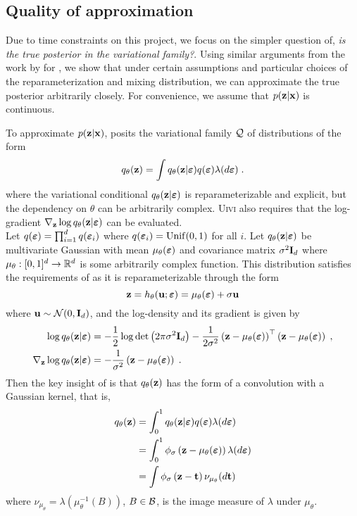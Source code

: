 \documentclass[10pt]{article}
\begin{document}
\subsection{Quality of approximation}

\todo Due to time constraints on this project, we focus on the simpler question of, \textit{is the true posterior in the \uivi variational family?}. Using similar arguments from the work by \citet{Plummer:2021} for \nllvm, we show that under certain assumptions and particular choices of the reparameterization and mixing distribution, we can approximate the true posterior arbitrarily closely. For convenience, we assume that $p(\mathbf{z}|\mathbf{x})$ is continuous.

\todo

To approximate $p(\mathbf{z}|\mathbf{x})$, \uivi posits the variational family $\mathcal{Q}$ of distributions of the form
\[
q_\theta(\mathbf{z}) = \int q_\theta(\mathbf{z}|\bm{\varepsilon})q(\bm{\varepsilon})\lambda(d\bm{\varepsilon}) \;.
\]
where the variational conditional $q_\theta(\mathbf{z}|\bm{\varepsilon})$ is reparameterizable and explicit, but the dependency on $\theta$ can be arbitrarily complex. \textsc{Uivi} also requires that the log-gradient $\nabla_{\mathbf{z}}\log q_\theta(\mathbf{z}|\bm{\varepsilon})$ can be evaluated.
\\

Let $q(\bm{\varepsilon})=\prod_{i=1}^dq(\bm{\varepsilon}_i)$ where $q(\bm{\varepsilon}_i)=\mathrm{Unif}(0,1)$ for all $i$. Let $q_\theta(\mathbf{z}|\bm{\varepsilon})$ be multivariate Gaussian with mean $\mu_\theta(\bm{\varepsilon})$ and covariance matrix $\sigma^2\mathbf{I}_d$ where $\mu_\theta:[0,1]^d\rightarrow\mathbb{R}^d$ is some arbitrarily complex function. This distribution satisfies the requirements of \uivi as it is reparameterizable through the form
\[
\mathbf{z} = h_\theta(\mathbf{u};\bm{\varepsilon}) = \mu_\theta(\bm{\varepsilon}) + \sigma\mathbf{u}
\]
where $\mathbf{u}\sim \mathcal{N}(0,\mathbf{I}_d)$, and the log-density and its gradient is given by
\begin{align*}
\log q_\theta(\mathbf{z}|\bm{\varepsilon}) &= -\frac{1}{2}\log\det\left(2\pi\sigma^2\mathbf{I}_d\right)-\frac{1}{2\sigma^2}\left(\mathbf{z}-\mu_\theta(\bm{\varepsilon})\right)^\top\left(\mathbf{z}-\mu_\theta(\bm{\varepsilon})\right) \;, \\
\nabla_{\mathbf{z}} \log q_\theta(\mathbf{z}|\bm{\varepsilon}) &= -\frac{1}{\sigma^2}\left(\mathbf{z}-\mu_\theta(\bm{\varepsilon})\right) \;.
\end{align*}
Then the key insight of \citet{Plummer:2021} is that $q_\theta(\mathbf{z})$ has the form of a convolution with a Gaussian kernel, that is,
\begin{align*}
q_\theta(\mathbf{z}) &= \int_0^1 q_\theta(\mathbf{z}|\bm{\varepsilon})q(\bm{\varepsilon})\lambda(d\bm{\varepsilon}) \\
&= \int_0^1 \phi_\sigma\left(\mathbf{z}-\mu_\theta(\bm{\varepsilon})\right)\lambda(d\bm{\varepsilon}) \\
&= \int \phi_\sigma\left(\mathbf{z}-\mathbf{t}\right)\nu_{\mu_\theta}(d\mathbf{t})
\end{align*}
where $\nu_{\mu_\theta}=\lambda\left(\mu_\theta^{-1}(B)\right)$, $B\in\mathcal{B}$, is the image measure of $\lambda$ under $\mu_\theta$. \todo
\end{document}

